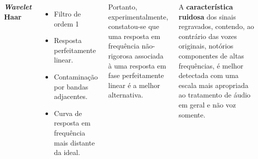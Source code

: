 \begin{frame}
{\begin{columns}
			\par \textbf{\textit{Wavelet} Haar}
			\begin{itemize}
				\item Filtro de ordem 1
				\item Resposta perfeitamente linear.
				\item Contaminação por bandas adjacentes.
				\item Curva de resposta em frequência mais distante da ideal.
			\end{itemize}
			
			\par Portanto, experimentalmente, constatou-se que uma resposta em frequência não-rigorosa associada à uma resposta em fase perfeitamente linear é a melhor alternativa.\newline
			
			\par A \textbf{característica ruidosa} dos sinais regravados, contendo, ao contrário das vozes originais, notórios componentes de altas frequências, é melhor detectada com uma escala mais apropriada ao tratamento de áudio em geral e não voz somente.	
		\end{columns}
	}
	
\end{frame}